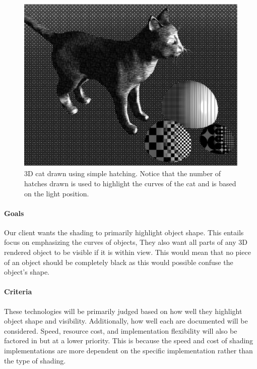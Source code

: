 \begin{figure} [H]
  \includegraphics[scale=0.5]{techreview_v1/three.eps}
  \caption
{ \newline \hspace{\linewidth}
3D cat drawn using simple hatching. Notice that the number of hatches drawn is used to highlight the curves of the cat and is based on the light position.}
  \label{fig:three}
\end{figure}

\paragraph{Goals}
Our client wants the shading to primarily highlight object shape. 
This entails focus on emphasizing the curves of objects, 
They also want all parts of any 3D rendered object to be visible if it is within view.
This would mean that no piece of an object should be completely black as this would possible confuse the object's shape.

\paragraph{Criteria}
These technologies will be primarily judged based on how well they highlight object shape and visibility. 
Additionally, how well each are documented will be considered.
Speed, resource cost, and implementation flexibility will also be factored in but at a lower priority. 
This is because the speed and cost of shading implementations are more dependent on the specific implementation rather than the type of shading.


